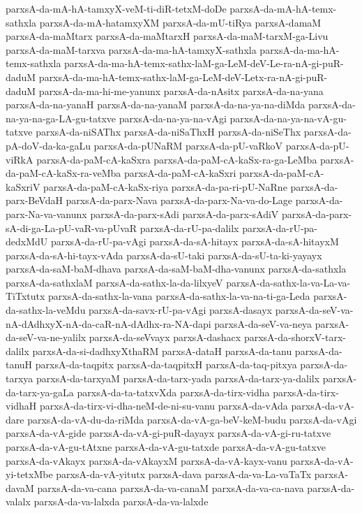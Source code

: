 {parxsA-da-mA-hA-tamxyX-veM-ti-diR-tetxM-doDe
parxsA-da-mA-hA-temx-sathxla
parxsA-da-mA-hatamxyXM
parxsA-da-mU-tiRya
parxsA-damaM
parxsA-da-maMtarx
parxsA-da-maMtarxH
parxsA-da-maM-tarxM-ga-Livu
parxsA-da-maM-tarxva
parxsA-da-ma-hA-tamxyX-sathxla
parxsA-da-ma-hA-temx-sathxla
parxsA-da-ma-hA-temx-sathx-laM-ga-LeM-deV-Le-ra-nA-gi-puR-daduM
parxsA-da-ma-hA-temx-sathx-laM-ga-LeM-deV-Letx-ra-nA-gi-puR-daduM
parxsA-da-ma-hi-me-yanunx
parxsA-da-nAsitx
parxsA-da-na-yana
parxsA-da-na-yanaH
parxsA-da-na-yanaM
parxsA-da-na-ya-na-diMda
parxsA-da-na-ya-na-ga-LA-gu-tatxve
parxsA-da-na-ya-na-vAgi
parxsA-da-na-ya-na-vA-gu-tatxve
parxsA-da-niSAThx
parxsA-da-niSaThxH
parxsA-da-niSeThx
parxsA-da-pA-doV-da-ka-gaLu
parxsA-da-pUNaRM
parxsA-da-pU-vaRkoV
parxsA-da-pU-viRkA
parxsA-da-paM-cA-kaSxra
parxsA-da-paM-cA-kaSx-ra-ga-LeMba
parxsA-da-paM-cA-kaSx-ra-veMba
parxsA-da-paM-cA-kaSxri
parxsA-da-paM-cA-kaSxriV
parxsA-da-paM-cA-kaSx-riya
parxsA-da-pa-ri-pU-NaRne
parxsA-da-parx-BeVdaH
parxsA-da-parx-Nava
parxsA-da-parx-Na-va-do-Lage
parxsA-da-parx-Na-va-vanunx
parxsA-da-parx-sAdi
parxsA-da-parx-sAdiV
parxsA-da-parx-sA-di-ga-La-pU-vaR-va-pUvaR
parxsA-da-rU-pa-dalilx
parxsA-da-rU-pa-dedxMdU
parxsA-da-rU-pa-vAgi
parxsA-da-sA-hitayx
parxsA-da-sA-hitayxM
parxsA-da-sA-hi-tayx-vAda
parxsA-da-sU-taki
parxsA-da-sU-ta-ki-yayayx
parxsA-da-saM-baM-dhava
parxsA-da-saM-baM-dha-vanunx
parxsA-da-sathxla
parxsA-da-sathxlaM
parxsA-da-sathx-la-da-lilxyeV
parxsA-da-sathx-la-va-La-va-TiTxtutx
parxsA-da-sathx-la-vana
parxsA-da-sathx-la-va-na-ti-ga-Leda
parxsA-da-sathx-la-veMdu
parxsA-da-savx-rU-pa-vAgi
parxsA-dasayx
parxsA-da-seV-va-nA-dAdhxyX-nA-da-caR-nA-dAdhx-ra-NA-dapi
parxsA-da-seV-va-neya
parxsA-da-seV-va-ne-yalilx
parxsA-da-seVvayx
parxsA-dashacx
parxsA-da-shorxV-tarx-dalilx
parxsA-da-si-dadhxyXthaRM
parxsA-dataH
parxsA-da-tanu
parxsA-da-tanuH
parxsA-da-taqpitx
parxsA-da-taqpitxH
parxsA-da-taq-pitxya
parxsA-da-tarxya
parxsA-da-tarxyaM
parxsA-da-tarx-yada
parxsA-da-tarx-ya-dalilx
parxsA-da-tarx-ya-gaLa
parxsA-da-ta-tatxvXda
parxsA-da-tirx-vidha
parxsA-da-tirx-vidhaH
parxsA-da-tirx-vi-dha-neM-de-ni-su-vanu
parxsA-da-vAda
parxsA-da-vA-dare
parxsA-da-vA-du-da-riMda
parxsA-da-vA-ga-beV-keM-budu
parxsA-da-vAgi
parxsA-da-vA-gide
parxsA-da-vA-gi-puR-dayayx
parxsA-da-vA-gi-ru-tatxve
parxsA-da-vA-gu-tAtxne
parxsA-da-vA-gu-tatxde
parxsA-da-vA-gu-tatxve
parxsA-da-vAkayx
parxsA-da-vAkayxM
parxsA-da-vA-kayx-vanu
parxsA-da-vA-yi-tetxMbe
parxsA-da-vA-yitutx
parxsA-dava
parxsA-da-va-La-vaTaTx
parxsA-davaM
parxsA-da-va-cana
parxsA-da-va-canaM
parxsA-da-va-ca-nava
parxsA-da-valalx
parxsA-da-va-lalxda
parxsA-da-va-lalxde
}

